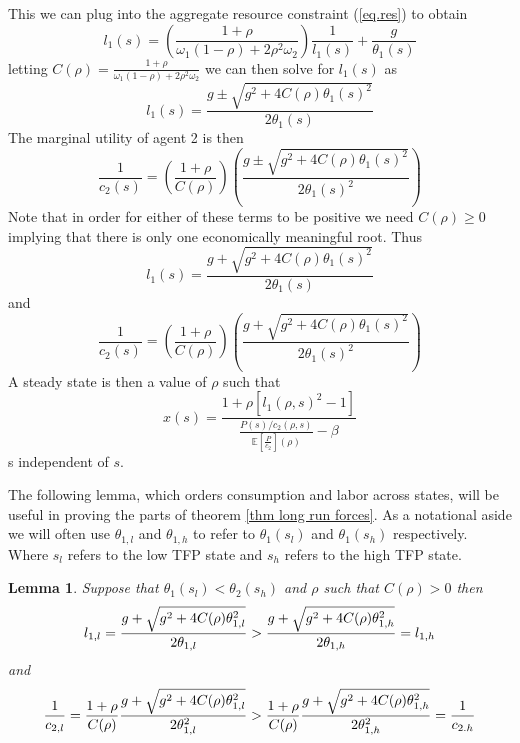 \documentclass[thmsb,11pt]{article}
\newtheorem{lemma}{Lemma}
\begin{document}
This we can plug into the aggregate resource constraint (\ref{eq.res}) to
obtain
\begin{equation*}
l_1(s) = \left(\frac{1+\rho}{\omega_1(1-\rho)+2\rho^2\omega_2}\right)\frac{1}{l_1(s)} +
\frac{g}{\theta_1(s)}
\end{equation*}%
letting $C(\rho) = \frac{1+\rho}{\omega_1(1-\rho)+2\rho^2\omega_2}$ we can
then solve for $l_1(s)$ as
\begin{equation*}
l_1(s) = \frac{g\pm\sqrt{g^2+4C(\rho)\theta_1(s)^2}}{2\theta_1(s)}
\end{equation*}
The marginal utility of agent 2 is then
\begin{equation*}
\frac1{c_2(s)} = \left(\frac{1+\rho}{C(\rho)}\right)\left(\frac{g\pm\sqrt{g^2+4C(\rho)%
\theta_1(s)^2}}{2\theta_1(s)^2}\right)
\end{equation*}%
Note that in order for either of these terms to be positive we need $%
C(\rho)\geq 0$ implying that there is only one economically meaningful root.
Thus
\begin{equation}
l_1(s) = \frac{g+\sqrt{g^2+4C(\rho)\theta_1(s)^2}}{2\theta_1(s)}
\end{equation}
and
\begin{equation}
\frac1{c_2(s)} = \left(\frac{1+\rho}{C(\rho)}\right)\left(\frac{g+\sqrt{g^2+4C(\rho)%
\theta_1(s)^2}}{2\theta_1(s)^2} \right) \label{eq.uc2}
\end{equation}
A steady state is then a value of $\rho$ such that
\begin{equation}
x(s) = \frac{1+\rho[l_1(\rho,s)^2-1]}{\frac{P(s)/c_2(\rho,s)}{\mathbb{E}%
[\frac{P}{c_2}](\rho)}-\beta}  \label{eq.xSS}
\end{equation}%
s independent of $s$.

The following lemma, which orders consumption and labor across states, will
be useful in proving the parts of theorem \ref{thm long run forces}.  As a notational aside we
will often use $\theta_{1,l}$ and $\theta_{1,h}$ to refer to $%
\theta_{1}(s_l) $ and $\theta_{1}(s_h)$ respectively. Where $s_l$ refers to
the low TFP state and $s_h$ refers to the high TFP state.

\begin{lemma}
Suppose that $\theta_1(s_l) < \theta_2(s_h)$ and $\rho$ such that $C(\rho) >
0$ then
\begin{equation*}
l_{1,l} = \frac{g+\sqrt{g^2+4C(\rho)\theta_{1,l}^2}}{2\theta_{1,l}} > \frac{%
g+\sqrt{g^2+4C(\rho)\theta_{1,h}^2}}{2\theta_{1,h}} = l_{1,h}
\end{equation*}
and
\begin{equation*}
\frac1{c_{2,l}} = \frac{1+\rho}{C(\rho)}\frac{g+\sqrt{g^2+4C(\rho)%
\theta_{1,l}^2}}{2\theta_{1,l}^2} > \frac{1+\rho}{C(\rho)}\frac{g+\sqrt{%
g^2+4C(\rho)\theta_{1,h}^2}}{2\theta_{1,h}^2} = \frac1{c_{2.h}}
\end{equation*}%
\label{lem.1}
\end{lemma}
\end{document}

